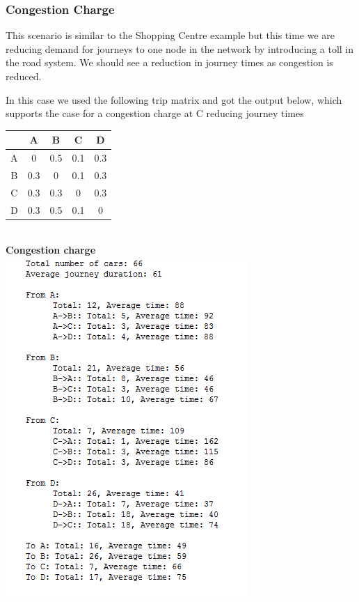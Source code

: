     
\subsubsection{Congestion Charge}
This scenario is similar to the Shopping Centre example but this time we are reducing demand for journeys to one node in the network by introducing a toll in the road system.  We should see a reduction in journey times as congestion is reduced.
   
    

In this case we used the following trip matrix and got the output below, which supports the case for a congestion charge at C reducing journey times
 \begin{center}
	\begin{tabular}{| c | c | c | c | c |}
		\hline
		\textbf{ }	&	A & B & C & D \\ \hline
		A				&	0 & 0.5 & 0.1 & 0.3				\\ \hline
		B					&	0.3 & 0 & 0.1 & 0.3				\\ \hline
		C	&	0.3 & 0.3 & 0 & 0.3			\\ \hline
		D				&	0.3 & 0.5 & 0.1 & 0				\\ \hline

		
	\end{tabular}
	\end{center}
~ \\ \textbf{Congestion charge}\\
    \includegraphics[scale=1.0]{./images/scenario3.png}